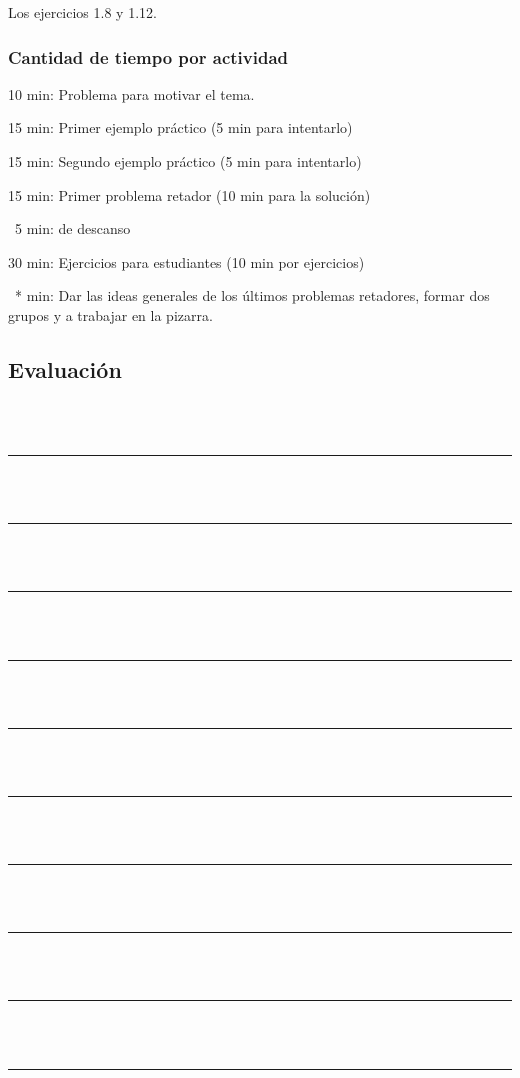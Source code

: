Los ejercicios 1.8 y 1.12.

\subsubsection{Cantidad de tiempo por actividad}

10 min: Problema para motivar el tema.

15 min: Primer ejemplo práctico (5 min para intentarlo)

15 min: Segundo ejemplo práctico (5 min para intentarlo)

15 min: Primer problema retador (10 min para la solución)

\ 5 min: de descanso

30 min: Ejercicios para estudiantes (10 min por ejercicios)

\ * min: Dar las ideas generales de los últimos problemas retadores, formar dos grupos y a trabajar en la pizarra.


\subsection{Evaluación}
\\
\vspace{10mm}\\
\hrule\\
\vspace{6mm}
\ \hrule\\
\vspace{6mm}
\ \hrule\\
\vspace{6mm}
\ \hrule\\
\vspace{6mm}
\ \hrule\\
\vspace{6mm}
\ \hrule\\
\vspace{6mm}
\ \hrule\\
\vspace{6mm}
\ \hrule\\
\vspace{6mm}
\ \hrule\\
\vspace{6mm}
\ \hrule\\